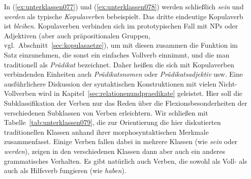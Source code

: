 
In (\ref{ex:unterklassen077}) und (\ref{ex:unterklassen078}) werden schließlich \textit{sein} und \textit{werden} als typische \textit{Kopulaverben} bebeispielt.
Das dritte eindeutige Kopulaverb ist \textit{bleiben}.
Kopulaverben verbinden sich im prototypischen Fall mit NPs oder Adjektiven (aber auch präpositionalen Gruppen, vgl.\ Abschnitt~\ref{sec:kopulasaetze}), um mit diesen zusammen die Funktion im Satz einzunehmen, die sonst ein einfaches Vollverb einnimmt, und die man traditionell als \textit{Prädikat} bezeichnet.
Daher heißen die sich mit Kopulaverben verbindenden Einheiten auch \textit{Prädikatsnomen} oder \textit{Prädikatsadjektiv} usw.
Eine ausführlichere Diskussion der syntaktischen Konstruktionen mit vielen Nicht-Vollverben wird in Kapitel~\ref{sec:relationenundpraedikate} geleistet.
Hier soll die Subklassifikation der Verben nur das Reden über die Flexionsbesonderheiten der verschiedenen Subklassen von Verben erleichtern.
Wir schließen mit Tabelle~\ref{tab:unterklassen079}, die zur Orientierung die hier diskutierten traditionellen Klassen anhand ihrer morphosyntaktischen Merkmale zusammenfasst.
Einige Verben fallen dabei in mehrere Klassen (wie \zB \textit{sein} oder \textit{werden}), zeigen in den verschiedenen Klassen dann aber auch ein anderes grammatisches Verhalten.
Es gibt natürlich auch Verben, die sowohl als Voll- als auch als Hilfsverb fungieren (wie \textit{haben}).

\begin{table}[!htbp]
  \caption{Traditionelle Verbklassen und ihre Eigenschaften}
  \label{tab:unterklassen079}
\end{table}

